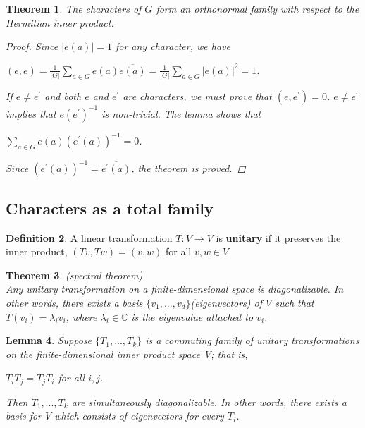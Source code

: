 \documentclass[psamsfonts]{amsart}
\newtheorem{thm}{Theorem}[section]
\newtheorem{lem}[thm]{Lemma}
\theoremstyle{definition}
\newtheorem{defn}[thm]{Definition}
\theoremstyle{remark}
\numberwithin{equation}{section}
\begin{document}
			\begin{thm}
				The characters of $G$ form an orthonormal family with respect to the Hermitian inner product.
				\begin{proof}
					Since $|e(a)| = 1$ for any character, we have\\
					\begin{center}
						$(e,e) = \frac{1}{|G|} \sum_{a \in G} e(a)\overline{e(a)} = \frac{1}{|G|} \sum_{a \in G} |e(a)|^2 = 1$.
					\end{center}
					\vspace{2mm}
					If $e \neq e^{\prime}$ and both $e$ and $e^{\prime}$ are characters, we must prove that $(e,e^{\prime}) = 0$.
					$e \neq e^{\prime}$ implies that $e(e^{\prime})^{-1}$ is non-trivial. The lemma shows that\\
					\begin{center}
						$\sum_{a \in G} e(a)(e^{\prime}(a))^{-1} = 0$.
					\end{center}
					\vspace{2mm}
					
					Since $(e^{\prime}(a))^{-1} = \overline{e^{\prime}(a)}$, the theorem is proved.
				\end{proof}
			\end{thm}			
		\vspace{1mm}
		
		\subsection{Characters as a total family}
			\begin{defn}
				A linear transformation $T : V \rightarrow V$ is \textbf{unitary} if it preserves the inner product, $(Tv,Tw) = (v,w)$ for all $v,w \in V$
			\end{defn}		
		
			\begin{thm}
				(spectral theorem)\\
				Any unitary transformation on a finite-dimensional space is diagonalizable. In other words, there exists a basis $\{v_1,...,v_d\}$(eigenvectors) of $V$ such that $T(v_i)=\lambda_iv_i$, where $\lambda_i \in \mathbb{C}$ is the eigenvalue attached to $v_i$.
			\end{thm}
			
			\begin{lem}
				Suppose $\{T_1,...,T_k\}$ is a commuting family of unitary transformations on the finite-dimensional inner product space V; that is,\\
				\begin{center}
					$T_iT_j = T_jT_i$ \hspace{2mm} for all $i,j$.
				\end{center}
				\hspace{2mm}
				Then $T_1,...,T_k$ are simultaneously diagonalizable. In other words, there exists a basis for $V$ which consists of eigenvectors for every $T_i$.
			\end{lem}
						
\end{document}

